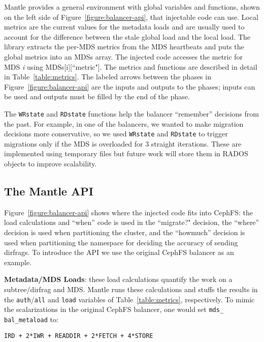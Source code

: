 Mantle provides a general environment with global variables and functions, shown on the left side of Figure~\ref{figure:balancer-api}, that injectable code can use. Local metrics are the current values for the metadata loads and are usually used to account for the difference between the stale global load and the local load. The library extracts the per-MDS metrics from the MDS heartbeats and puts the global metrics into an MDSs array. The injected code accesses the metric for MDS {\it i} using MDSs[i][``metric"]. The metrics and functions are described in detail in Table~\ref{table:metrics}. The labeled arrows between the phases in Figure~\ref{figure:balancer-api} are the inputs and outputs to the phases; inputs can be used and outputs must be filled by the end of the phase.

The \texttt{WRstate} and \texttt{RDstate} functions help the balancer ``remember'' decisions from the past. For example, in one of the balancers, we wanted to make migration decisions more conservative, so we used \texttt{WRstate} and \texttt{RDstate} to trigger migrations only if the MDS is overloaded for 3 straight iterations. These are implemented using temporary files but future work will store them in RADOS objects to improve scalability.

\subsection{The Mantle API}
\label{the-mantle-api}
Figure~\ref{figure:balancer-api} shows where the injected code fits into CephFS: the load calculations and ``when'' code is used in the ``migrate?" decision, the ``where'' decision is used when partitioning the cluster, and the ``howmuch'' decision is used when partitioning the namespace for deciding the accuracy of sending dirfrags. To introduce the API we use the original CephFS balancer as an example. 

\textbf{Metadata/MDS Loads}: these load calculations quantify the work on a subtree/dirfrag and MDS. Mantle runs these calculations and stuffs the results in the \texttt{auth}/\texttt{all} and \texttt{load} variables of Table~\ref{table:metrics}, respectively. To mimic the scalarizations in the original CephFS balancer, one would set \texttt{mds\_} \texttt{bal\_}\texttt{metaload} to:

{\small\begin{verbatim}
IRD + 2*IWR + READDIR + 2*FETCH + 4*STORE
\end{verbatim}}

